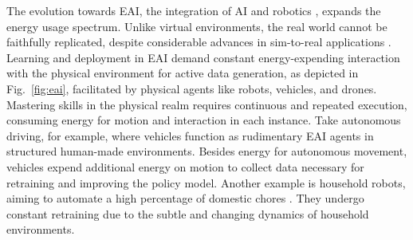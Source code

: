 \documentclass[12pt]{article}
\begin{document}
The evolution towards EAI, the integration of AI and robotics \cite{Pfeifer2004Embodiedartificialintelligence}, expands the energy usage spectrum. Unlike virtual environments, the real world cannot be faithfully replicated, despite considerable advances in sim-to-real applications \cite{Chebotar2019Closingsimreal}. Learning and deployment in EAI demand constant energy-expending interaction with the physical environment for active data generation, as depicted in Fig.~\ref{fig:eai}, facilitated by physical agents like robots, vehicles, and drones. Mastering skills in the physical realm requires continuous and repeated execution, consuming energy for motion and interaction in each instance. Take autonomous driving, for example, where vehicles function as rudimentary EAI agents in structured human-made environments. Besides energy for autonomous movement, vehicles expend additional energy on motion to collect data necessary for retraining and improving the policy model. Another example is household robots, aiming to automate a high percentage of domestic chores \cite{Lehdonvirta2022futuresunpaidwork}. They undergo constant retraining due to the subtle and changing dynamics of household environments.
\end{document}
